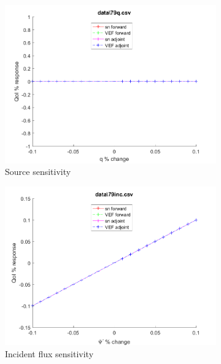 \documentclass{article}
\begin{document}
\begin{figure}[H]
\label{Case79Sens}
\centering
\begin{subfigure}{.5\textwidth}
  \centering
  \includegraphics[width=.98\linewidth]{IanProposal/figures2/79qSens.png}
  \caption{Source sensitivity}
  \label{fig:sfig1}
\end{subfigure}%
\begin{subfigure}{.5\textwidth}
  \centering
  \includegraphics[width=.98\linewidth]{IanProposal/figures2/79incSens.png}
  \caption{Incident flux sensitivity}
  \label{fig:sfig4}
\end{subfigure}%
\\
\begin{subfigure}{.5\textwidth}
  \centering

\end{subfigure}
\end{figure}
\end{document}
